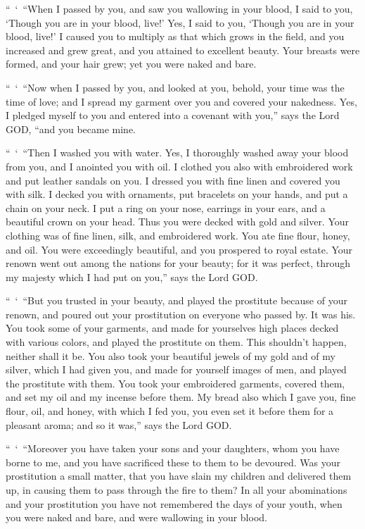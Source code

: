 \myverse{}“ ‘ “When I passed by you, and saw you wallowing in your blood,
I said to you, ‘Though you are in your blood, live!’ Yes, I said to you, ‘Though you are in your blood,
live!’
\myverse{}I caused you to multiply as that which grows in the field, and you increased
and grew great, and you attained to excellent beauty. Your breasts were formed, and your hair grew; yet
you were naked and bare.

\myverse{}“ ‘ “Now when I passed by you, and looked at you, behold, your time
was the time of love; and I spread my garment over you and covered your nakedness. Yes, I pledged myself
to you and entered into a covenant with you,” says the Lord GOD, “and you became mine.

\myverse{}“ ‘ “Then I washed you with water. Yes, I thoroughly washed away
your blood from you, and I anointed you with oil.
\myverse{}I clothed you also with embroidered work and put leather sandals on you.
I dressed you with fine linen and covered you with silk.
\myverse{}I decked you with ornaments, put bracelets on your hands, and put a chain
on your neck.
\myverse{}I put a ring on your nose, earrings in your ears, and a beautiful crown on
your head.
\myverse{}Thus you were decked with gold and silver. Your clothing was of fine linen,
silk, and embroidered work. You ate fine flour, honey, and oil. You were exceedingly beautiful, and you
prospered to royal estate.
\myverse{}Your renown went out among the nations for your beauty; for it was perfect,
through my majesty which I had put on you,” says the Lord GOD.

\myverse{}“ ‘ “But you trusted in your beauty, and played the prostitute
because of your renown, and poured out your prostitution on everyone who passed by. It was his.
\myverse{}You took some of your garments, and made for yourselves high places decked
with various colors, and played the prostitute on them. This shouldn’t happen, neither shall it be.
\myverse{}You also took your beautiful jewels of my gold and of my silver, which I
had given you, and made for yourself images of men, and played the prostitute with them.
\myverse{}You took your embroidered garments, covered them, and set my oil and my incense
before them.
\myverse{}My bread also which I gave you, fine flour, oil, and honey, with which I
fed you, you even set it before them for a pleasant aroma; and so it was,” says the Lord GOD.

\myverse{}“ ‘ “Moreover you have taken your sons and your daughters, whom
you have borne to me, and you have sacrificed these to them to be devoured. Was your prostitution a small
matter,
\myverse{}that you have slain my children and delivered them up, in causing them to
pass through the fire to them?
\myverse{}In all your abominations and your prostitution you have not remembered the
days of your youth, when you were naked and bare, and were wallowing in your blood.

